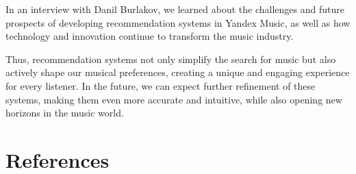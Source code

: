 \documentclass[12pt,a4paper]{article}
\begin{document}
In an interview with Danil Burlakov, we learned about the challenges and future prospects of developing recommendation systems in Yandex Music, as well as how technology and innovation continue to transform the music industry.

Thus, recommendation systems not only simplify the search for music but also actively shape our musical preferences, creating a unique and engaging experience for every listener. In the future, we can expect further refinement of these systems, making them even more accurate and intuitive, while also opening new horizons in the music world.

\sloppy
\newpage
\section{References}


\end{document}
